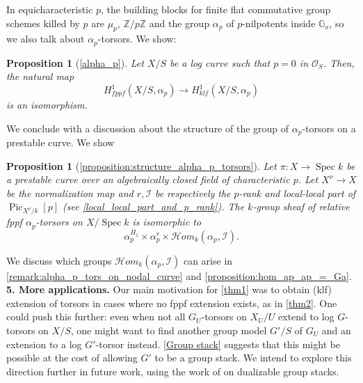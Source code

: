 \documentclass[a4paper,11pt]{amsart} %
\numberwithin{equation}{subsection}
\newcommand{\on}[1]{\operatorname{#1}}
\newcommand{\bb}[1]{{\mathbb{#1}}}
\newcommand{\ca}[1]{{\mathcal{#1}}}
\def\sheafhom{\mathcal{H}om}
\newcommand{\Spec}{\operatorname{Spec}}
\theoremstyle{definition}
\theoremstyle{plain}%
\newtheorem{proposition}[definition]{Proposition}
\theoremstyle{remark}
\begin{document}
In equicharacteristic $p$, the building blocks for finite flat commutative group schemes killed by $p$ are $\mu_p$, $\bb Z/p\bb Z$ and the group $\alpha_p$ of $p$-nilpotents inside $\bb G_a$, so we also talk about $\alpha_p$-torsors. We show:

\begin{proposition}[\ref{alpha_p}]
    Let $X/S$ be a log curve such that $p=0$ in $\ca O_S$. Then, the natural map
    \[
    H^1_{fppf}(X/S,\alpha_p) \to H^1_{klf}(X/S,\alpha_p)
    \]
    is an isomorphism.
\end{proposition}

 We conclude with a discussion about the structure of the group of $\alpha_p$-torsors on a prestable curve. We show

\begin{proposition}[\ref{proposition:structure_alpha_p_torsors}]
    Let $\pi \colon X \to \Spec k$ be a prestable curve over an algebraically closed field of characteristic $p$. Let $X^\nu \to X$ be the normalization map and $r,\ca I$ be respectively the $p$-rank and local-local part of $\on{Pic}_{X^\nu/k}[p]$ (see \ref{local_local_part_and_p_rank}). The $k$-group sheaf of relative fppf $\alpha_p$-torsors on $X/\Spec k$ is isomorphic to
    \[
    \alpha_p^{H_1} \times \alpha_p^r \times \sheafhom_k(\alpha_p,\ca I).
    \]
\end{proposition}
We discuss which groups $\sheafhom_k(\alpha_p,\ca I)$ can arise in \ref{remark:alpha_p_tors_on_nodal_curve} and \ref{proposition:hom_ap_ap_=_Ga}.\\

\noindent\textbf{5. More applications.} Our main motivation for \ref{thm1} was to obtain (klf) extension of torsors in cases where no fppf extension exists, as in \ref{thm2}. One could push this further: even when not all $G_U$-torsors on $X_U/U$ extend to log $G$-torsors on $X/S$, one might want to find another group model $G'/S$ of $G_U$ and an extension to a log $G'$-torsor instead. \ref{Group stack} suggests that this might be possible at the cost of allowing $G'$ to be a group stack. We intend to explore this direction further in future work, using the work of \cite{SBr} on dualizable group stacks.
\end{document}
